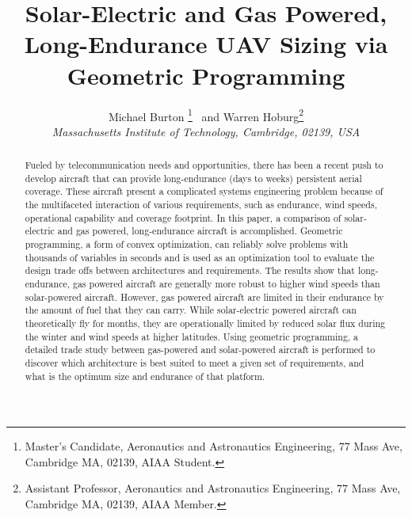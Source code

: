 \usepackage{tikz}
\title{Solar-Electric and Gas Powered, Long-Endurance UAV Sizing via Geometric Programming}

 \author{
  Michael Burton \thanks{Master's Candidate, Aeronautics and Astronautics Engineering, 77 Mass Ave, Cambridge MA, 02139, AIAA Student.}
  \ and Warren Hoburg\thanks{Assistant Professor, Aeronautics and Astronautics Engineering, 77 Mass Ave, Cambridge MA, 02139, AIAA Member.}\\
  {\normalsize\itshape
   Massachusetts Institute of Technology, Cambridge, 02139, USA}\\
 }


 \newcommand{\eqnref}[1]{(\ref{#1})}
 \newcommand{\class}[1]{\texttt{#1}}
 \newcommand{\package}[1]{\texttt{#1}}
 \newcommand{\file}[1]{\texttt{#1}}
 \newcommand{\BibTeX}{\textsc{Bib}\TeX}
 \usepackage{hyperref}
 \hypersetup{citecolor = blue}



\graphicspath{{./figs/}} 
\maketitle

\begin{abstract}
    Fueled by telecommunication needs and opportunities, there has been a recent push to develop aircraft that can provide long-endurance (days to weeks) persistent aerial coverage.
    These aircraft present a complicated systems engineering problem because of the multifaceted interaction of various requirements, such as endurance, wind speeds, operational capability and coverage footprint.
    In this paper, a comparison of solar-electric and gas powered, long-endurance aircraft is accomplished.
    Geometric programming, a form of convex optimization, can reliably solve problems with thousands of variables in seconds and is used as an optimization tool to evaluate the design trade offs between architectures and requirements.
    The results show that long-endurance, gas powered aircraft are generally more robust to higher wind speeds than solar-powered aircraft.  
    However, gas powered aircraft are limited in their endurance by the amount of fuel that they can carry. 
    While solar-electric powered aircraft can theoretically fly for months, they are operationally limited by reduced solar flux during the winter and wind speeds at higher latitudes.
    Using geometric programming, a detailed trade study between gas-powered and solar-powered aircraft is performed to discover which architecture is best suited to meet a given set of requirements, and what is the optimum size and endurance of that platform.
\end{abstract}

